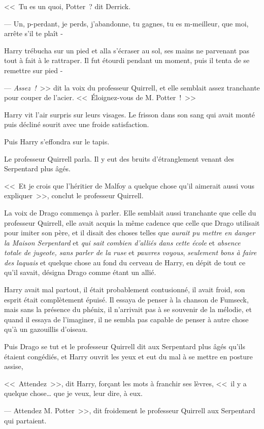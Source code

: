 <<~Tu es un quoi, Potter~? dit Derrick.

--- Un, p-perdant, je perds, j'abandonne, tu gagnes, tu es m-meilleur, que moi, arrête s'il te plaît -

Harry trébucha sur un pied et alla s'écraser au sol, ses mains ne parvenant pas tout à fait à le rattraper. Il fut étourdi pendant un moment, puis il tenta de se remettre sur pied -

--- \emph{Assez~!}~>> dit la voix du professeur Quirrell, et elle semblait assez tranchante pour couper de l'acier. <<~Éloignez-vous de M. Potter~!~>>

Harry vit l'air surpris sur leurs visages. Le frisson dans son sang qui avait monté puis décliné sourit avec une froide satisfaction.

Puis Harry s'effondra sur le tapis.

Le professeur Quirrell parla. Il y eut des bruits d'étranglement venant des Serpentard plus âgés.

<<~Et je crois que l'héritier de Malfoy a quelque chose qu'il aimerait aussi vous expliquer~>>, conclut le professeur Quirrell.

La voix de Drago commença à parler. Elle semblait aussi tranchante que celle du professeur Quirrell, elle avait acquis la même cadence que celle que Drago utilisait pour imiter son père, et il disait des choses telles que \emph{aurait pu mettre en danger la Maison Serpentard} et \emph{qui sait combien d'alliés dans cette école} et \emph{absence totale de jugeote, sans parler de la ruse} et \emph{pauvres voyous}, \emph{seulement bons à faire des laquais} et quelque chose au fond du cerveau de Harry, en dépit de tout ce qu'il savait, désigna Drago comme étant un allié.

Harry avait mal partout, il était probablement contusionné, il avait froid, son esprit était complètement épuisé. Il essaya de penser à la chanson de Fumseck, mais sans la présence du phénix, il n'arrivait pas à se souvenir de la mélodie, et quand il essaya de l'imaginer, il ne sembla pas capable de penser à autre chose qu'à un gazouillis d'oiseau.

Puis Drago se tut et le professeur Quirrell dit aux Serpentard plus âgés qu'ils étaient congédiés, et Harry ouvrit les yeux et eut du mal à se mettre en posture assise,

<<~Attendez~>>, dit Harry, forçant les mots à franchir ses lèvres, <<~il y a quelque chose… que je veux, leur dire, à eux.

--- Attendez M. Potter~>>, dit froidement le professeur Quirrell aux Serpentard qui partaient.

